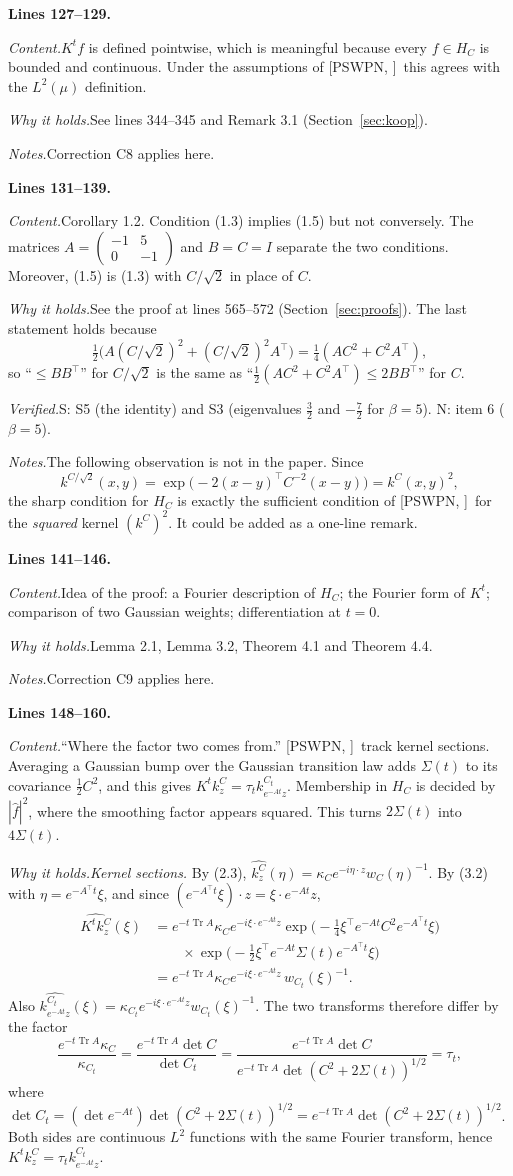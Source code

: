 \documentclass[11pt]{amsart}
\newcommand{\Tr}{\operatorname{Tr}}
\newcommand{\hatf}[1]{\widehat{#1}}
\newcommand{\tp}{\top}
\newcommand{\src}[1]{\par\bigskip\noindent\textbf{Lines #1.}\enspace}
\newcommand{\content}{\par\smallskip\noindent\textit{Content.}\enspace}
\newcommand{\why}{\par\smallskip\noindent\textit{Why it holds.}\enspace}
\newcommand{\verified}{\par\smallskip\noindent\textit{Verified.}\enspace}
\newcommand{\notes}{\par\smallskip\noindent\textit{Notes.}\enspace}
\newcommand{\tS}{\textsf{S}}
\newcommand{\tN}{\textsf{N}}
\newcommand{\PS}[1][]{[PSWPN\ifx\relax#1\relax\else, #1\fi]}
\begin{document}
\src{127--129}
\content $K^tf$ is defined pointwise, which is meaningful because every $f\in H_C$ is bounded and continuous. Under the
assumptions of \PS\ this agrees with the $L^2(\mu)$ definition.
\why See lines 344--345 and Remark 3.1 (Section~\ref{sec:koop}).
\notes Correction C8 applies here.

\src{131--139}
\content Corollary 1.2. Condition (1.3) implies (1.5) but not conversely. The matrices
$A=\begin{pmatrix}-1&5\\0&-1\end{pmatrix}$ and $B=C=I$ separate the two conditions. Moreover, (1.5) is (1.3) with
$C/\sqrt2$ in place of $C$.
\why See the proof at lines 565--572 (Section~\ref{sec:proofs}). The last statement holds because
\[
\tfrac12\bigl(A(C/\sqrt2)^2+(C/\sqrt2)^2A^\tp\bigr)=\tfrac14(AC^2+C^2A^\tp),
\]
so ``$\le BB^\tp$'' for $C/\sqrt2$ is the same as ``$\frac12(AC^2+C^2A^\tp)\le2BB^\tp$'' for $C$.
\verified \tS: S5 (the identity) and S3 (eigenvalues $\frac32$ and $-\frac72$ for $\beta=5$). \tN: item 6 ($\beta=5$).
\notes The following observation is not in the paper. Since
\[
k^{C/\sqrt2}(x,y)=\exp\bigl(-2(x-y)^\tp C^{-2}(x-y)\bigr)=k^C(x,y)^2,
\]
the sharp condition for $H_C$ is exactly the sufficient condition of \PS\ for the \emph{squared} kernel $(k^C)^2$. It
could be added as a one-line remark.

\src{141--146}
\content Idea of the proof: a Fourier description of $H_C$; the Fourier form of $K^t$; comparison of two Gaussian
weights; differentiation at $t=0$.
\why Lemma 2.1, Lemma 3.2, Theorem 4.1 and Theorem 4.4.
\notes Correction C9 applies here.

\src{148--160}
\content ``Where the factor two comes from.'' \PS\ track kernel sections. Averaging a Gaussian bump over the Gaussian
transition law adds $\Sigma(t)$ to its covariance $\frac12C^2$, and this gives $K^tk^C_z=\tau_tk^{C_t}_{e^{-At}z}$.
Membership in $H_C$ is decided by $|\hatf f|^2$, where the smoothing factor appears squared. This turns $2\Sigma(t)$
into $4\Sigma(t)$.
\why \emph{Kernel sections.} By (2.3), $\hatf{k^C_z}(\eta)=\kappa_Ce^{-i\eta\cdot z}w_C(\eta)^{-1}$. By (3.2) with
$\eta=e^{-A^\tp t}\xi$, and since $(e^{-A^\tp t}\xi)\cdot z=\xi\cdot e^{-At}z$,
\begin{align*}
\hatf{K^tk^C_z}(\xi)
&=e^{-t\Tr A}\kappa_Ce^{-i\xi\cdot e^{-At}z}
\exp\bigl(-\tfrac14\xi^\tp e^{-At}C^2e^{-A^\tp t}\xi\bigr)\\
&\qquad\times\exp\bigl(-\tfrac12\xi^\tp e^{-At}\Sigma(t)e^{-A^\tp t}\xi\bigr)\\
&=e^{-t\Tr A}\kappa_Ce^{-i\xi\cdot e^{-At}z}\,w_{C_t}(\xi)^{-1}.
\end{align*}
Also $\hatf{k^{C_t}_{e^{-At}z}}(\xi)=\kappa_{C_t}e^{-i\xi\cdot e^{-At}z}w_{C_t}(\xi)^{-1}$. The two transforms therefore
differ by the factor
\[
\frac{e^{-t\Tr A}\kappa_C}{\kappa_{C_t}}=\frac{e^{-t\Tr A}\det C}{\det C_t}
=\frac{e^{-t\Tr A}\det C}{e^{-t\Tr A}\det(C^2+2\Sigma(t))^{1/2}}=\tau_t ,
\]
where $\det C_t=(\det e^{-At})\det(C^2+2\Sigma(t))^{1/2}=e^{-t\Tr A}\det(C^2+2\Sigma(t))^{1/2}$. Both sides are
continuous $L^2$ functions with the same Fourier transform, hence $K^tk^C_z=\tau_tk^{C_t}_{e^{-At}z}$.
\end{document}
